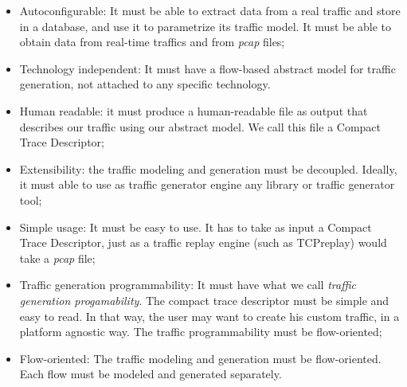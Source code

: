 \begin{itemize}
	
	\item Autoconfigurable: It must be able to extract data from a real traffic and store in a database, and use it to parametrize its traffic model. It must be able to obtain data from real-time traffics and from \textit{pcap} files;
	
	\item Technology independent: It must have a flow-based abstract model for traffic generation, not attached to any specific technology.
	
	\item Human readable: it must produce a human-readable file as output that describes our traffic using our abstract model. We call this file a Compact Trace Descriptor;
	
	\item Extensibility: the traffic modeling and generation must be decoupled. Ideally, it must able to use as traffic generator engine any library or traffic generator tool;
	
	\item Simple usage: It must be easy to use. It has to take as input a Compact Trace Descriptor, just as a traffic replay engine (such as TCPreplay) would take a \textit{pcap} file;
	
	\item Traffic generation programmability: It must have what we call \textit{traffic generation progamability}. The compact trace descriptor must be simple and easy to read. In that way, the user may want to create his custom traffic, in a platform agnostic way. The traffic programmability must be flow-oriented;
	
	\item Flow-oriented: The traffic modeling and generation must be flow-oriented. Each flow must be modeled and generated separately.
	
\end{itemize}









